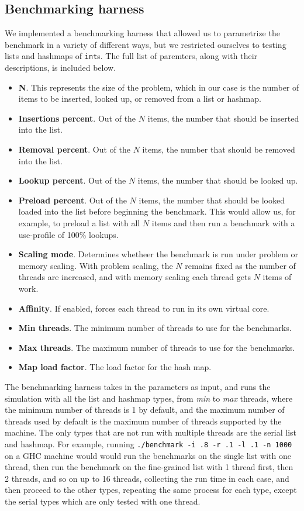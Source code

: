 \documentclass[11pt]{article}
\begin{document}
\subsection{Benchmarking harness}
We implemented a benchmarking harness that allowed us to parametrize the
benchmark in a variety of different ways, but we restricted ourselves to testing
lists and hashmaps of {\tt int}s. The full list of paremters, along with their
descriptions, is included below.

\begin{itemize}
\item
{\bf N}. This represents the size of the problem, which in our case is the
number of items to be inserted, looked up, or removed from a list or hashmap.
\item
{\bf Insertions percent}. Out of the $N$ items, the number that should be
inserted into the list.
\item
{\bf Removal percent}. Out of the $N$ items, the number that should be removed
into the list.
\item
{\bf Lookup percent}. Out of the $N$ items, the number that should be looked up.
\item
{\bf Preload percent}. Out of the $N$ items, the number that should be looked
loaded into the list before beginning the benchmark. This would allow us, for
example, to preload a list with all $N$ items and then run a benchmark with a
use-profile of 100\% lookups.
\item
{\bf Scaling mode}. Determines whetheer the benchmark is run under problem or
memory scaling. With problem scaling, the $N$ remains fixed as the number of
threads are increased, and with memory scaling each thread gets $N$ items of
work.
\item
{\bf Affinity}. If enabled, forces each thread to run in its own virtual core.
\item
{\bf Min threads}. The minimum number of threads to use for the benchmarks.
\item
{\bf Max threads}. The maximum number of threads to use for the benchmarks.
\item
{\bf Map load factor}. The load factor for the hash map.
\end{itemize}

The benchmarking harness takes in the parameters as input, and runs the
simulation with all the list and hashmap types, from {\it min} to {\it max}
threads, where the minimum number of threads is 1 by default, and the maximum
number of threads used by default is the maximum number of threads supported by
the machine. The only types that are not run with multiple threads are the
serial list and hashmap. For example, running
{\tt ./benchmark -i .8 -r .1 -l .1 -n 1000} on a GHC machine would would run the
benchmarks on the single list with one thread, then run the benchmark on the
fine-grained list with 1 thread first, then 2 threads, and so on up to 16
threads, collecting the run time in each case, and then proceed to the other
types, repeating the same process for each type, except the serial types which
are only tested with one thread.
\end{document}
